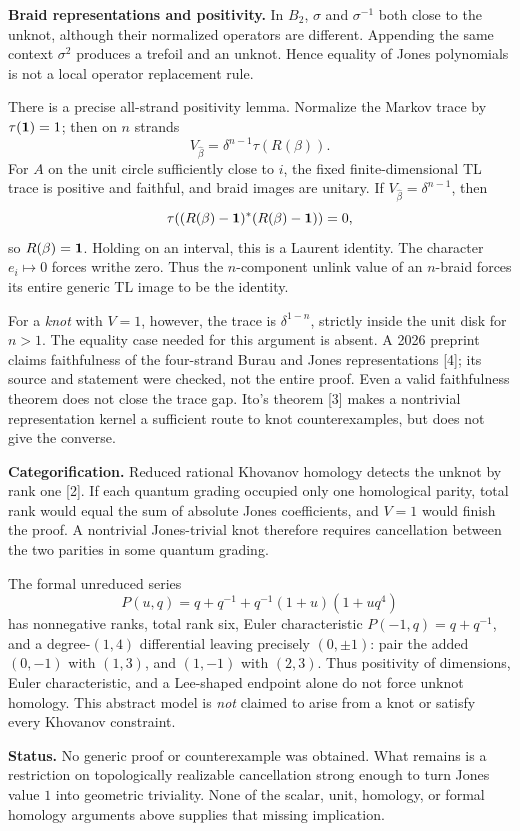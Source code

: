 \documentclass[10pt]{article}
\begin{document}
\textbf{Braid representations and positivity.}
In \(B_2\), \(\sigma\) and \(\sigma^{-1}\) both close to the unknot, although
their normalized operators are different. Appending the same context
\(\sigma^2\) produces a trefoil and an unknot. Hence equality of Jones
polynomials is not a local operator replacement rule.

There is a precise all-strand positivity lemma. Normalize the Markov trace by
\(\tau(\mathbf 1)=1\); then on \(n\) strands
\[
 V_{\widehat\beta}=\delta^{n-1}\tau(R(\beta)).
\]
For \(A\) on the unit circle sufficiently close to \(i\), the fixed
finite-dimensional TL trace is positive and faithful, and braid images are
unitary. If \(V_{\widehat\beta}=\delta^{n-1}\), then
\[
 \tau((R(\beta)-\mathbf 1)^*(R(\beta)-\mathbf 1))=0,
\]
so \(R(\beta)=\mathbf 1\). Holding on an interval, this is a Laurent identity.
The character \(e_i\mapsto0\) forces writhe zero.
Thus the \(n\)-component unlink value of an \(n\)-braid forces its entire
generic TL image to be the identity.

For a \emph{knot} with \(V=1\), however, the trace is \(\delta^{1-n}\), strictly
inside the unit disk for \(n>1\). The equality case needed for this argument is
absent. A 2026 preprint claims faithfulness of the four-strand Burau and Jones
representations [4]; its source and statement were checked, not the entire proof.
Even a valid faithfulness theorem does not close the trace gap. Ito's theorem [3]
makes a nontrivial representation kernel a sufficient route to knot counterexamples,
but does not give the converse.

\textbf{Categorification.}
Reduced rational Khovanov homology detects the unknot by rank one [2].
If each quantum grading occupied only one homological parity, total rank would
equal the sum of absolute Jones coefficients, and \(V=1\) would finish the proof.
A nontrivial Jones-trivial knot therefore requires cancellation between the
two parities in some quantum grading.

The formal unreduced series
\[
 P(u,q)=q+q^{-1}+q^{-1}(1+u)(1+uq^4)
\]
has nonnegative ranks, total rank six, Euler characteristic
\(P(-1,q)=q+q^{-1}\), and a degree-\((1,4)\) differential leaving precisely
\((0,\pm1)\): pair the added \((0,-1)\) with \((1,3)\), and \((1,-1)\) with
\((2,3)\). Thus positivity of dimensions, Euler characteristic, and a Lee-shaped
endpoint alone do not force unknot homology. This abstract model is \emph{not}
claimed to arise from a knot or satisfy every Khovanov constraint.

\textbf{Status.}
No generic proof or counterexample was obtained. What remains is a restriction
on topologically realizable cancellation strong enough to turn Jones value \(1\)
into geometric triviality. None of the scalar, unit, homology, or formal homology
arguments above supplies that missing implication.
\end{document}
